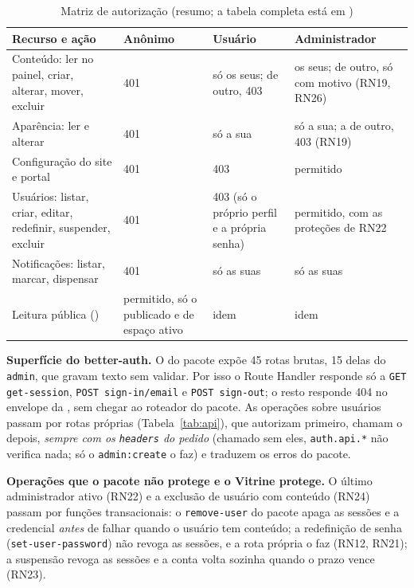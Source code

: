 \begin{table}[htb]
\caption{Matriz de autorização (resumo; a tabela completa está em )}\label{tab:matriz-authz}
\small
\begin{tabularx}{\linewidth}{@{}L{3.6cm}L{2.7cm}L{2.7cm}Y@{}}
\toprule
\textbf{Recurso e ação} & \textbf{Anônimo} & \textbf{Usuário} & \textbf{Administrador}\\
\midrule
Conteúdo: ler no painel, criar, alterar, mover, excluir & 401 & só os seus; de outro, 403 & os seus; de outro, só com motivo (RN19, RN26)\\
\addlinespace
Aparência: ler e alterar & 401 & só a sua & só a sua; a de outro, 403 (RN19)\\
\addlinespace
Configuração do site e portal & 401 & 403 & permitido\\
\addlinespace
Usuários: listar, criar, editar, redefinir, suspender, excluir & 401 & 403 (só o próprio perfil e a própria senha) & permitido, com as proteções de RN22\\
\addlinespace
Notificações: listar, marcar, dispensar & 401 & só as suas & só as suas\\
\addlinespace
Leitura pública () & permitido, só o publicado e de espaço ativo & idem & idem\\
\bottomrule
\end{tabularx}
\end{table}

\textbf{Superfície do better-auth.} O   do pacote expõe 45 rotas brutas, 15 delas do  \texttt{admin}, que gravam texto sem validar. Por isso o Route Handler responde só a \texttt{GET get-session}, \texttt{POST sign-in/email} e \texttt{POST sign-out}; o resto responde 404 no envelope da , sem chegar ao roteador do pacote. As operações sobre usuários passam por rotas próprias (Tabela~\ref{tab:api}), que autorizam primeiro, chamam o  depois, \emph{sempre com os \texttt{headers} do pedido} (chamado sem eles, \texttt{auth.api.*} não verifica nada; só o  \texttt{admin:create} o faz) e traduzem os erros do pacote.

\textbf{Operações que o pacote não protege e o Vitrine protege.} O último administrador ativo (RN22) e a exclusão de usuário com conteúdo (RN24) passam por funções transacionais: o \texttt{remove-user} do pacote apaga as sessões e a credencial \emph{antes} de falhar quando o usuário tem conteúdo; a redefinição de senha (\texttt{set-user-password}) não revoga as sessões, e a rota própria o faz (RN12, RN21); a suspensão revoga as sessões e a conta volta sozinha quando o prazo vence (RN23).

